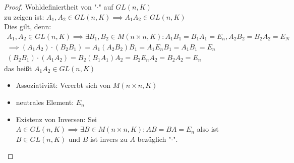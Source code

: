 \documentclass[a4paper]{scrartcl}
\DeclareMathOperator{\Exists}{\exists}
\theoremstyle{definition}
\theoremstyle{plain}
\theoremstyle{plain}
\theoremstyle{remark}
\theoremstyle{remark}
\theoremstyle{remark}
\theoremstyle{remark}
\theoremstyle{remark}
\begin{document}
\begin{proof}
Wohldefiniertheit von "$\cdot$" auf $GL(n, K)$ \\
  zu zeigen ist: $A_1, A_2 \in GL(n, K) \implies A_1 A_2 \in GL(n,K)$ \\
  Dies gilt, denn:
\begin{align*}
A_1, A_2 \in GL(n, K) \implies \Exists B_1, B_2 \in M(n\times n, K): A_1 B_1 = B_1 A_1 = E_n, A_2 B_2 = B_2 A_2 = E_N \\
\implies (A_1 A_2) \cdot (B_2 B_1) = A_1(A_2 B_2) B_1 = A_1 E_n B_1 = A_1 B_1 = E_n \\
(B_2 B_1) \cdot (A_1 A_2) = B_2 (B_1 A_1) A_2 = B_2 E_n A_2 = B_2 A_2 = E_n
\end{align*}
das heißt $A_1 A_2 \in GL(n,K)$
\begin{itemize}
\item Assoziativiät: Vererbt sich von $M(n\times n, K)$
\item neutrales Element: $E_n$
\item Existenz von Inversen: Sei $A\in GL(n,K) \implies \Exists B\in M(n\times n, K): AB = BA = E_n$ also ist $B\in GL(n,K)$ und $B$ ist invers zu $A$ bezüglich "$\cdot$".
\end{itemize}
\end{proof}
\end{document}
